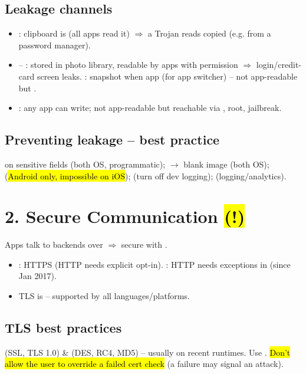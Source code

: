 \subsection{Leakage channels}
\begin{itemize}
\item {}: clipboard is  (all apps read it) $\Rightarrow$ a Trojan reads copied  (e.g. from a password manager). 
\item {} -- : stored in photo library, readable by apps with permission $\Rightarrow$ login/credit-card screen leaks. : snapshot when app  (for app switcher) -- not app-readable but .
\item {}: any app can write; not app-readable but reachable via , root, jailbreak. 
\end{itemize}
\subsection{Preventing leakage -- best practice}
 on sensitive fields (both OS, programmatic);  $\to$ blank image (both OS);  (\hl{Android only, impossible on iOS});  (turn off dev logging);  (logging/analytics).

\section{2. Secure Communication \hl{(!)}}
Apps talk to backends over  $\Rightarrow$ secure with .
\begin{itemize}
\item {}: HTTPS  (HTTP needs explicit opt-in). : HTTP needs exceptions in  (since Jan 2017).
\item TLS is  -- supported by all languages/platforms.
\end{itemize}
\subsection{TLS best practices}
 (SSL, TLS 1.0) \&  (DES, RC4, MD5) -- usually  on recent runtimes. Use . \hl{Don't allow the user to override a failed cert check} (a failure may signal an attack).
